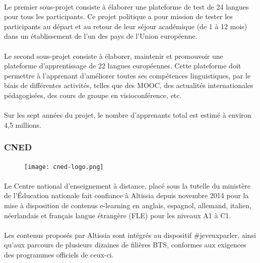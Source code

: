 \paragraph{}
Le premier sous-projet consiste à élaborer une plateforme de test de 24 langues pour tous les participants. Ce projet politique a pour mission de tester les participants au départ et au retour de leur séjour académique (de 1 à 12 mois) dans un établissement de l’un des pays de l’Union européenne.

\paragraph{}
Le second sous-projet consiste à élaborer, maintenir et promouvoir une plateforme d’apprentissage de 22 langues européennes. Cette plateforme doit permettre à l’apprenant d’améliorer toutes ses compétences linguistiques, par le biais de différentes activités, telles que des MOOC, des actualités internationales pédagogisées, des cours de groupe en visioconférence, etc.

\paragraph{}
Sur les sept années du projet, le nombre d’apprenants total est estimé à environ 4,5 millions.

\subsubsection{CNED}
\begin{figure}
    \centering
    \texttt{[image: cned-logo.png]}
\end{figure}
\paragraph{}
Le Centre national d’enseignement à distance, placé sous la tutelle du ministère de l’Éducation nationale fait confiance à Altissia depuis novembre 2014 pour la mise à disposition de contenus e-learning en anglais, espagnol, allemand, italien, néerlandais et français langue étrangère (FLE) pour les niveaux A1 à C1.

\paragraph{}
Les contenus proposés par Altissia sont intégrés au dispositif \#jeveuxparler, ainsi qu’aux parcours de plusieurs dizaines de filières BTS, conformes aux exigences des programmes officiels de ceux-ci. 

